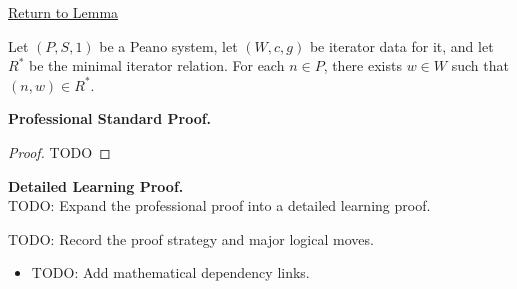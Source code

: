 \newpage
{}
\label{prf:minimal-iterator-relation-complete}

\begin{remark*}[Return]
\hyperref[lem:minimal-iterator-relation-complete]{Return to Lemma}
\end{remark*}

\begin{theorem*}
Let $(P,S,1)$ be a Peano system, let $(W,c,g)$ be iterator data for it, and let
$R^*$ be the minimal iterator relation. For each $n\in P$, there exists
$w\in W$ such that $(n,w)\in R^*$.
\end{theorem*}

\textbf{Professional Standard Proof.}~\\
\begin{proof}
TODO
\end{proof}

\textbf{Detailed Learning Proof.}~\\
TODO: Expand the professional proof into a detailed learning proof.

\begin{remark*}
TODO: Record the proof strategy and major logical moves.
\end{remark*}

\begin{dependencies}
\begin{itemize}
  \item TODO: Add mathematical dependency links.
\end{itemize}
\end{dependencies}
